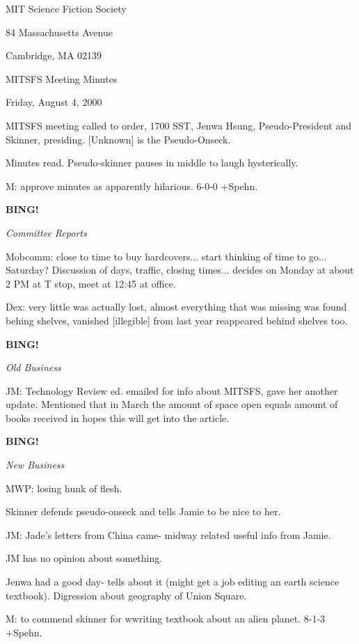 \documentclass[12pt]{article}
\newcommand{\bing}{{\bf BING!} }
\newcommand{\goto}[1]{\bing \vskip 12pt \centerline{{\em{#1}}}}
\begin{document}
\begin{center}

MIT Science Fiction Society 

84 Massachusetts Avenue

Cambridge, MA 02139

\vspace{12pt}

MITSFS Meeting Minutes 

Friday, August 4, 2000

\end{center}
 
\vspace{18pt}

\setlength{\parskip}{6pt}

\noindent
MITSFS meeting called to order, 1700 SST, Jenwa Hsung, Pseudo-President and
Skinner, presiding. [Unknown] is the Pseudo-Onseck.

Minutes read. Pseudo-skinner pauses in middle to laugh hysterically.

M: approve minutes as apparently hilarious. 6-0-0 +Spehn.

\goto{Committee Reports}

Mobcomm: close to time to buy hardcovers... start thinking of time to go... Saturday? Discussion of days, traffic, closing times... decides on Monday at about 2 PM at T stop, meet at 12:45 at office.

Dex: very little was actually lost, almost everything that was missing was found behing shelves, vanished [illegible] from last year reappeared behind shelves too.

\goto{Old Business}

JM: Technology Review ed. emailed for info about MITSFS, gave her another update. Mentioned that in March the amount of space open equals amount of books received in hopes this will get into the article.

\goto{New Business}

MWP: losing hunk of flesh.

Skinner defends pseudo-onseck and tells Jamie to be nice to her.

JM: Jade's letters from China came- midway related useful info from Jamie.

JM has no opinion about something.

Jenwa had a good day- tells about it (might get a job editing an earth science textbook). Digression about geography of Union Square.

M: to commend skinner for wwriting textbook about an alien planet. 8-1-3 +Spehn.
\end{document}
